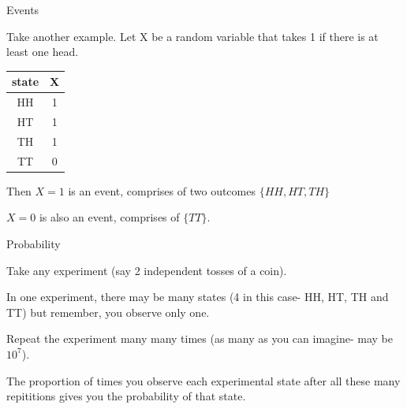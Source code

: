 \documentclass{beamer}\usepackage[]{graphicx}\usepackage[]{color}
\begin{document}
\begin{frame}[fragile]{Events  \;\;}

Take another example. Let X be a random variable that takes 1 if there is
at least one head. \pause \newline

\begin{tabular}{|c|c|}
\hline
state & X \\ \hline
HH & 1 \\ \hline
HT & 1 \\ \hline
TH & 1 \\ \hline
TT & 0 \\ \hline
\end{tabular}

Then  $X=1$ is an event, comprises of two outcomes $\{HH, HT, TH \}$ \pause \newline

$X=0$ is also an event, comprises of $\{ TT \}$.

\end{frame}

\begin{frame}[fragile]{Probability  \;\;}

Take any experiment (say 2 independent tosses of a coin).  \pause \newline

In one experiment, there may be many states (4 in this case- HH, HT, TH and TT) but remember, you observe only one. \pause \newline

Repeat the experiment many many times (as many as you can imagine- may be $10^7$). \pause \newline

The proportion of times you observe each experimental state after all these many repititions gives you the probability of that state.

\end{frame}
\end{document}
